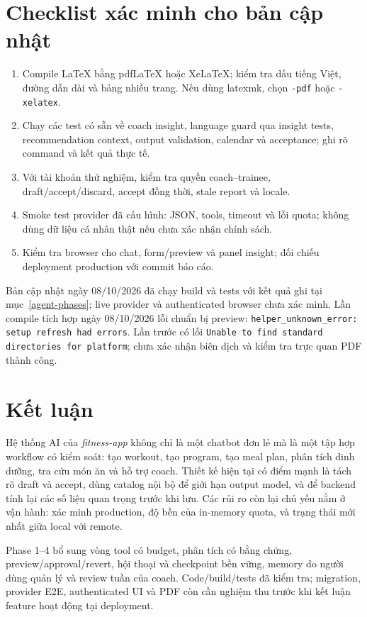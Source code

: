 \documentclass[12pt,a4paper]{article}
\newcommand{\code}[1]{\texttt{#1}}
\begin{document}
\section{Checklist xác minh cho bản cập nhật}
\begin{enumerate}
  \item Compile LaTeX bằng pdfLaTeX hoặc XeLaTeX; kiểm tra dấu tiếng Việt, đường dẫn dài và bảng nhiều trang. Nếu dùng latexmk, chọn \code{-pdf} hoặc \code{-xelatex}.
  \item Chạy các test có sẵn về coach insight, language guard qua insight tests, recommendation context, output validation, calendar và acceptance; ghi rõ command và kết quả thực tế.
  \item Với tài khoản thử nghiệm, kiểm tra quyền coach--trainee, draft/accept/discard, accept đồng thời, stale report và locale.
  \item Smoke test provider đã cấu hình: JSON, tools, timeout và lỗi quota; không dùng dữ liệu cá nhân thật nếu chưa xác nhận chính sách.
  \item Kiểm tra browser cho chat, form/preview và panel insight; đối chiếu deployment production với commit báo cáo.
\end{enumerate}
Bản cập nhật ngày 08/10/2026 đã chạy build và tests với kết quả ghi tại mục~\ref{agent-phases}; live provider và authenticated browser chưa xác minh. Lần compile tích hợp ngày 08/10/2026 lỗi chuẩn bị preview: \code{helper\_unknown\_error: setup refresh had errors}. Lần trước có lỗi \code{Unable to find standard directories for platform}; chưa xác nhận biên dịch và kiểm tra trực quan PDF thành công.

\section{Kết luận}

Hệ thống AI của \textit{fitness-app} không chỉ là một chatbot đơn lẻ mà là một tập hợp workflow có kiểm soát: tạo workout, tạo program, tạo meal plan, phân tích dinh dưỡng, tra cứu món ăn và hỗ trợ coach. Thiết kế hiện tại có điểm mạnh là tách rõ draft và accept, dùng catalog nội bộ để giới hạn output model, và để backend tính lại các số liệu quan trọng trước khi lưu. Các rủi ro còn lại chủ yếu nằm ở vận hành: xác minh production, độ bền của in-memory quota, và trạng thái mới nhất giữa local với remote.

Phase 1--4 bổ sung vòng tool có budget, phân tích có bằng chứng, preview/approval/revert, hội thoại và checkpoint bền vững, memory do người dùng quản lý và review tuần của coach. Code/build/tests đã kiểm tra; migration, provider E2E, authenticated UI và PDF còn cần nghiệm thu trước khi kết luận feature hoạt động tại deployment.
\end{document}
